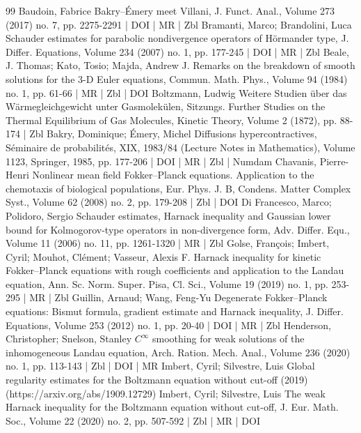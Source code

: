 \documentclass[10pt]{amsart}
\theoremstyle{definition}\newtheorem{defi}[theo]{Definition}\newtheorem{rema}[theo]{Remark}\newtheorem{exam}[theo]{Example}\newtheorem{exem}[theo]{Example}\newtheorem{nota}[theo]{Notation}
\begin{document}
\begin{thebibliography}{99}
Baudoin, Fabrice Bakry–Émery meet Villani, J. Funct. Anal., Volume 273 (2017) no. 7, pp. 2275-2291 | DOI | MR | Zbl
Bramanti, Marco; Brandolini, Luca Schauder estimates for parabolic nondivergence operators of Hörmander type, J. Differ. Equations, Volume 234 (2007) no. 1, pp. 177-245 | DOI | MR | Zbl
Beale, J. Thomas; Kato, Tosio; Majda, Andrew J. Remarks on the breakdown of smooth solutions for the $3$-D Euler equations, Commun. Math. Phys., Volume 94 (1984) no. 1, pp. 61-66 | MR | Zbl | DOI
Boltzmann, Ludwig Weitere Studien über das Wärmegleichgewicht unter Gasmolekülen, Sitzungs. Further Studies on the Thermal Equilibrium of Gas Molecules, Kinetic Theory, Volume 2 (1872), pp. 88-174 | Zbl
Bakry, Dominique; Émery, Michel Diffusions hypercontractives, Séminaire de probabilités, XIX, 1983/84 (Lecture Notes in Mathematics), Volume 1123, Springer, 1985, pp. 177-206 | DOI | MR | Zbl | Numdam
Chavanis, Pierre-Henri Nonlinear mean field Fokker–Planck equations. Application to the chemotaxis of biological populations, Eur. Phys. J. B, Condens. Matter Complex Syst., Volume 62 (2008) no. 2, pp. 179-208 | Zbl | DOI
Di Francesco, Marco; Polidoro, Sergio Schauder estimates, Harnack inequality and Gaussian lower bound for Kolmogorov-type operators in non-divergence form, Adv. Differ. Equ., Volume 11 (2006) no. 11, pp. 1261-1320 | MR | Zbl
Golse, François; Imbert, Cyril; Mouhot, Clément; Vasseur, Alexis F. Harnack inequality for kinetic Fokker–Planck equations with rough coefficients and application to the Landau equation, Ann. Sc. Norm. Super. Pisa, Cl. Sci., Volume 19 (2019) no. 1, pp. 253-295 | MR | Zbl
Guillin, Arnaud; Wang, Feng-Yu Degenerate Fokker–Planck equations: Bismut formula, gradient estimate and Harnack inequality, J. Differ. Equations, Volume 253 (2012) no. 1, pp. 20-40 | DOI | MR | Zbl
Henderson, Christopher; Snelson, Stanley ${C}^\infty $ smoothing for weak solutions of the inhomogeneous Landau equation, Arch. Ration. Mech. Anal., Volume 236 (2020) no. 1, pp. 113-143 | Zbl | DOI | MR
Imbert, Cyril; Silvestre, Luis Global regularity estimates for the Boltzmann equation without cut-off (2019) (https://arxiv.org/abs/1909.12729)
Imbert, Cyril; Silvestre, Luis The weak Harnack inequality for the Boltzmann equation without cut-off, J. Eur. Math. Soc., Volume 22 (2020) no. 2, pp. 507-592 | Zbl | MR | DOI

\end{thebibliography}
\end{document}
